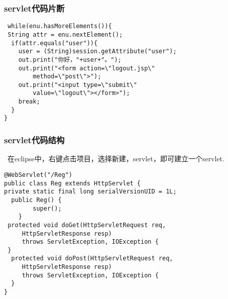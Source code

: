 \documentclass{beamer}
\begin{document}
\begin{frame}[fragile]
\frametitle{servlet代码片断}
\begin{lstlisting}
 while(enu.hasMoreElements()){
 String attr = enu.nextElement();
  if(attr.equals("user")){
    user = (String)session.getAttribute("user");
    out.print("你好，"+user+"。");
    out.print("<form action=\"logout.jsp\"
        method=\"post\">");
    out.print("<input type=\"submit\" 
        value=\"logout\"></form>");
    break;
  }
}
\end{lstlisting}
\end{frame}
\begin{frame}[fragile]
\frametitle{servlet代码结构}

 在eclipse中，右键点击项目，选择新建，servlet，即可建立一个servlet.
\begin{lstlisting}
@WebServlet("/Reg")
public class Reg extends HttpServlet {
private static final long serialVersionUID = 1L;    
  public Reg() {
        super();
    }
 protected void doGet(HttpServletRequest req, 
     HttpServletResponse resp) 
     throws ServletException, IOException {
 }
  protected void doPost(HttpServletRequest req, 
     HttpServletResponse resp) 
     throws ServletException, IOException {
  }
}
\end{lstlisting}
\end{frame}
\end{document}
